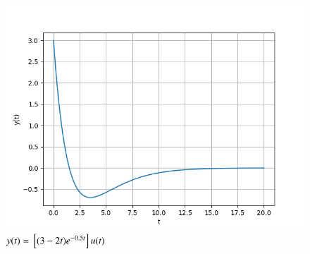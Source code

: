 \documentclass[journal,12pt,twocolumn]{IEEEtran}
\theoremstyle{remark}
\begin{document}
\begin{figure}[t]
    \centering
    \includegraphics[width=\columnwidth]{2021/AG/26/figs/fig1.png}
    \caption{$y(t) = {}\left[(3-2t)e^{-0.5t}\right]u(t)$}
    \label{fig:gate21ag26}
\end{figure}

\end{document}
